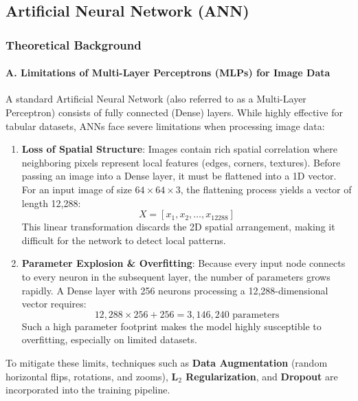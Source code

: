 \documentclass[12pt,a4paper]{article}
\begin{document}
\subsection{Artificial Neural Network (ANN)}

\subsubsection{Theoretical Background}

\paragraph{A. Limitations of Multi-Layer Perceptrons (MLPs) for Image Data}
A standard Artificial Neural Network (also referred to as a Multi-Layer Perceptron) consists of fully connected (Dense) layers. While highly effective for tabular datasets, ANNs face severe limitations when processing image data:
\begin{enumerate}
    \item \textbf{Loss of Spatial Structure}: Images contain rich spatial correlation where neighboring pixels represent local features (edges, corners, textures). Before passing an image into a Dense layer, it must be flattened into a 1D vector. For an input image of size $64 \times 64 \times 3$, the flattening process yields a vector of length 12,288:
    \begin{equation}
        X = [x_1, x_2, \dots, x_{12288}]
    \end{equation}
    This linear transformation discards the 2D spatial arrangement, making it difficult for the network to detect local patterns.
    \item \textbf{Parameter Explosion \& Overfitting}: Because every input node connects to every neuron in the subsequent layer, the number of parameters grows rapidly. A Dense layer with 256 neurons processing a 12,288-dimensional vector requires:
    \begin{equation}
        12,288 \times 256 + 256 = 3,146,240\text{ parameters}
    \end{equation}
    Such a high parameter footprint makes the model highly susceptible to overfitting, especially on limited datasets.
\end{enumerate}
To mitigate these limits, techniques such as \textbf{Data Augmentation} (random horizontal flips, rotations, and zooms), \textbf{L$_2$ Regularization}, and \textbf{Dropout} are incorporated into the training pipeline.
\end{document}
